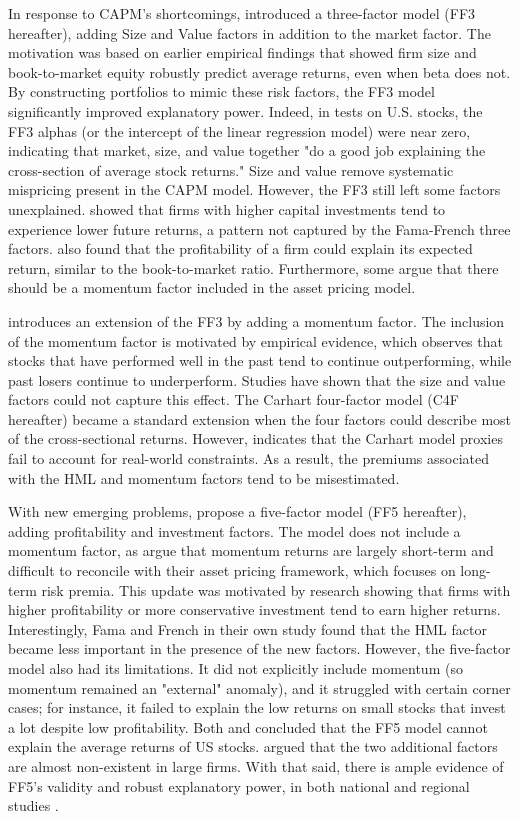 In response to CAPM's shortcomings,  introduced a three-factor model (FF3 hereafter), adding Size and Value factors in addition to the market factor. The motivation was based on earlier empirical findings that showed firm size and book-to-market equity robustly predict average returns, even when beta does not. By constructing portfolios to mimic these risk factors, the FF3 model significantly improved explanatory power. Indeed, in tests on U.S. stocks, the FF3 alphas (or the intercept of the linear regression model) were near zero, indicating that market, size, and value together "do a good job explaining the cross-section of average stock returns." Size and value remove systematic mispricing present in the CAPM model. However, the FF3 still left some factors unexplained.  showed that firms with higher capital investments tend to experience lower future returns, a pattern not captured by the Fama-French three factors.  also found that the profitability of a firm could explain its expected return, similar to the book-to-market ratio. Furthermore, some argue that there should be a momentum factor included in the asset pricing model.

 introduces an extension of the FF3 by adding a momentum factor. The inclusion of the momentum factor is motivated by empirical evidence, which observes that stocks that have performed well in the past tend to continue outperforming, while past losers continue to underperform. Studies have shown that the size and value factors could not capture this effect. The Carhart four-factor model (C4F hereafter) became a standard extension when the four factors could describe most of the cross-sectional returns. However,  indicates that the Carhart model proxies fail to account for real-world constraints. As a result, the premiums associated with the HML and momentum factors tend to be misestimated.

With new emerging problems,  propose a five-factor model (FF5 hereafter), adding profitability and investment factors. The model does not include a momentum factor, as  argue that momentum returns are largely short-term and difficult to reconcile with their asset pricing framework, which focuses on long-term risk premia. This update was motivated by research showing that firms with higher profitability or more conservative investment tend to earn higher returns. Interestingly, Fama and French in their own study found that the HML factor became less important in the presence of the new factors. However, the five-factor model also had its limitations. It did not explicitly include momentum (so momentum remained an "external" anomaly), and it struggled with certain corner cases; for instance, it failed to explain the low returns on small stocks that invest a lot despite low profitability. Both  and  concluded that the FF5 model cannot explain the average returns of US stocks.  argued that the two additional factors are almost non-existent in large firms. With that said, there is ample evidence of FF5's validity and robust explanatory power, in both national and regional studies \cite{sohor_litreview_2024}.

